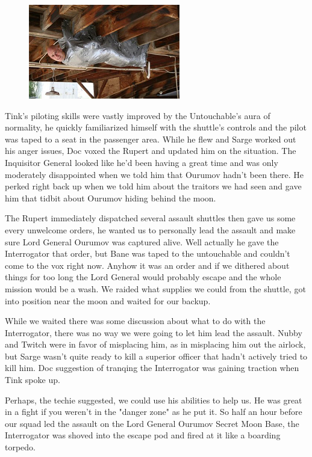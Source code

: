 \begin{figure}
	\begin{center}
		\includegraphics[width=\figwidth]{pics/9/50.png}
	\end{center}
\end{figure}
Tink's piloting skills were vastly improved by the Untouchable's aura of normality, he quickly familiarized himself with the shuttle's controls and the pilot was taped to a seat in the passenger area. 
While he flew and Sarge worked out his anger issues, Doc voxed the Rupert and updated him on the situation. 
The Inquisitor General looked like he'd been having a great time and was only moderately disappointed when we told him that Ourumov hadn't been there. 
He perked right back up when we told him about the traitors we had seen and gave him that tidbit about Ourumov hiding behind the moon.

The Rupert immediately dispatched several assault shuttles then gave us some every unwelcome orders, he wanted us to personally lead the assault and make sure Lord General Ourumov was captured alive. 
Well actually he gave the Interrogator that order, but Bane was taped to the untouchable and couldn't come to the vox right now. 
Anyhow it was an order and if we dithered about things for too long the Lord General would probably escape and the whole mission would be a wash. 
We raided what supplies we could from the shuttle, got into position near the moon and waited for our backup.

While we waited there was some discussion about what to do with the Interrogator, there was no way we were going to let him lead the assault. 
Nubby and Twitch were in favor of misplacing him, as in misplacing him out the airlock, but Sarge wasn't quite ready to kill a superior officer that hadn't actively tried to kill him. 
Doc suggestion of tranqing the Interrogator was gaining traction when Tink spoke up.

Perhaps, the techie suggested, we could use his abilities to help us. 
He was great in a fight if you weren't in the "danger zone" as he put it. 
So half an hour before our squad led the assault on the Lord General Ourumov Secret Moon Base, the Interrogator was shoved into the escape pod and fired at it like a boarding torpedo.

